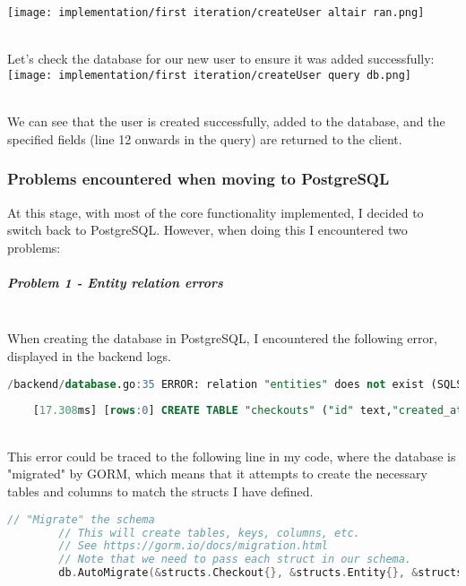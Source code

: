 \documentclass[../../main.tex]{subfiles}
\begin{document}
\texttt{[image: implementation/first iteration/createUser altair ran.png]}

\noindent \\ Let's check the database for our new user to ensure it was added successfully:\\

\texttt{[image: implementation/first iteration/createUser query db.png]}

\noindent \\ We can see that the user is created successfully, added to the database, and the specified fields (line 12 onwards in the query) are returned to the client.

\subsubsection{Problems encountered when moving to PostgreSQL}

\noindent At this stage, with most of the core functionality implemented, I decided to switch back to PostgreSQL. However, when doing this I encountered two problems:

\subparagraph{Problem 1 - Entity relation errors}

\noindent \\ When creating the database in PostgreSQL, I encountered the following error, displayed in the backend logs.

\begin{lstlisting}[language=SQL]
    /backend/database.go:35 ERROR: relation "entities" does not exist (SQLSTATE 42P01)
    
    [17.308ms] [rows:0] CREATE TABLE "checkouts" ("id" text,"created_at" timestamptz,"updated_at" timestamptz,"deleted_at" timestamptz,"take_date" timestamptz,"return_date" timestamptz,PRIMARY KEY ("id"),CONSTRAINT "fk_entities_checkouts" FOREIGN KEY ("id") REFERENCES "entities"("id"))
    \end{lstlisting}

\noindent \\ This error could be traced to the following line in my code, where the database is "migrated" by GORM, which means that it attempts to create the necessary tables and columns to match the structs I have defined.

\begin{lstlisting}[language=Go]
        // "Migrate" the schema
        // This will create tables, keys, columns, etc.
        // See https://gorm.io/docs/migration.html
        // Note that we need to pass each struct in our schema.
        db.AutoMigrate(&structs.Checkout{}, &structs.Entity{}, &structs.Item{}, &structs.User{})
    \end{lstlisting}
\end{document}
